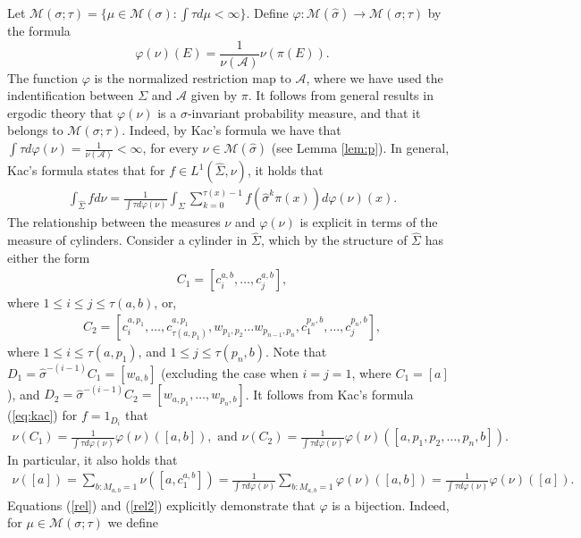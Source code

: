 \documentclass[letterpaper,11pt]{amsart}
\theoremstyle{plain}
\theoremstyle{plain}
\theoremstyle{definition}
\theoremstyle{remark}
\def\M{{\mathcal M}}
\def\A{{\mathcal A}}
\begin{document}
Let $\M(\sigma;\tau)=\{\mu\in\M(\sigma): \int\tau d\mu<\infty\}$. Define $\varphi:\M(\widehat{\sigma})\to \M(\sigma;\tau)$ by the formula $$\varphi(\nu)(E)=\frac{1}{\nu(\A)}\nu(\pi(E)).$$
The function $\varphi$ is the normalized restriction map to $\A$, where we have used the indentification between $\Sigma$ and $\A$ given by $\pi$. 
It follows from general results in ergodic theory %
that $\varphi(\nu)$ is a $\sigma$-invariant probability measure, and that it belongs to $\M(\sigma;\tau)$. Indeed, by Kac's formula we have that $\int {\tau} d \varphi(\nu)=\frac{1}{\nu(\A)}<\infty$, for every $\nu\in \M(\widehat{\sigma})$ (see Lemma \ref{lem:p}). In general, Kac's formula states that for $f\in L^1(\widehat{\Sigma},\nu)$, it holds that 
\begin{align}\label{eq:kac}\int_{\widehat{\Sigma}} fd\nu=\frac{1}{\int {\tau} d\varphi(\nu)}\int_\Sigma \sum_{k=0}^{{\tau}(x)-1}f(\widehat{\sigma}^k \pi(x))d\varphi(\nu)(x).\end{align}
The relationship between the measures $\nu$ and $\varphi(\nu)$ is explicit in terms of the measure of cylinders. Consider a cylinder in $\widehat{\Sigma}$, which by the structure of $\widehat{\Sigma}$ has either the form
\begin{align}\label{quepa1} C_1=[c_i^{a,b},\ldots ,c_{j}^{a,b}],\end{align} 
where $1\le i\le j\le \tau(a,b)$, or,
\begin{align}\label{quepa} C_2=[c_i^{a,p_1},\ldots ,c_{\tau(a,p_1)}^{a,p_1},w_{p_1,p_2}\ldots w_{p_{n-1},p_n}, c_1^{p_n,b},\ldots ,c_j^{p_n,b}],\end{align} 
where $1\le i\le \tau(a,p_1)$, and $1\le j\le \tau(p_n,b)$. Note that $D_1=\widehat{\sigma}^{-(i-1)}C_1=[w_{a,b}]$ (excluding the case when $i=j=1$, where $C_1=[a]$), and $D_2=\widehat{\sigma}^{-(i-1)}C_2=[w_{a,p_1},\ldots,w_{p_n,b}]$. It follows from Kac's formula (\ref{eq:kac}) for $f=1_{D_i}$ that 
\begin{align}\label{rel}\nu(C_1)=\frac{1}{\int {\tau} d\varphi(\nu)}\varphi(\nu)([a,b]),\text{ and } \nu(C_2)=\frac{1}{\int {\tau} d\varphi(\nu)}\varphi(\nu)([a,p_1,p_2,\ldots,p_n,b]).\end{align}
In particular, it also holds that
\begin{align}\label{rel2}\nu([a])=\sum_{b: M_{a,b}=1}\nu([a,c_1^{a,b}])=\frac{1}{\int {\tau} d\varphi(\nu)}\sum_{b: M_{a,b}=1} \varphi(\nu)([a,b])=\frac{1}{\int {\tau} d\varphi(\nu)}\varphi(\nu)([a]).\end{align} Equations (\ref{rel}) and (\ref{rel2}) explicitly demonstrate that $\varphi$ is a bijection. Indeed, for $\mu\in \M(\sigma;\tau)$ we define 
\end{document}
